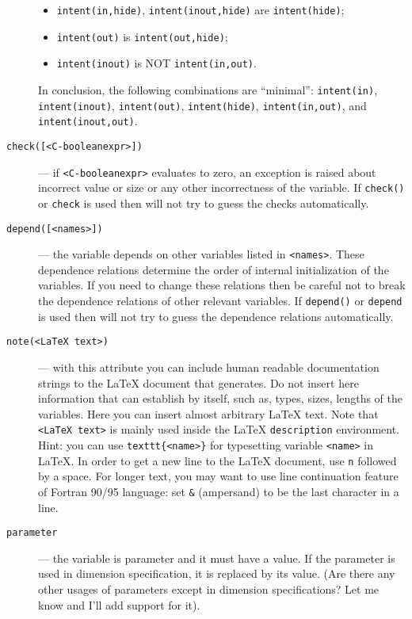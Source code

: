 \begin{description}
\begin{itemize}
  \item \texttt{intent(in,hide)}, \texttt{intent(inout,hide)} are \texttt{intent(hide)};
    \item \texttt{intent(out)} is \texttt{intent(out,hide)};
\item \texttt{intent(inout)} is NOT \texttt{intent(in,out)}.
  \end{itemize}
  In conclusion, the following combinations are ``minimal'':
  \texttt{intent(in)}, \texttt{intent(inout)}, \texttt{intent(out)},
  \texttt{intent(hide)}, \texttt{intent(in,out)}, and
  \texttt{intent(inout,out)}.
\item[\texttt{check([<C-booleanexpr>])}] --- if
  \texttt{<C-booleanexpr>} evaluates to zero, an exception is raised
  about incorrect value or size or any other incorrectness of the
  variable. If \texttt{check()} or \texttt{check} is used then \fpy
  will not try to guess the checks automatically.
\item[\texttt{depend([<names>])}] --- the variable depends on other
  variables listed in \texttt{<names>}. These dependence relations
  determine the order of internal initialization of the variables. If
  you need to change these relations then be careful not to break the
  dependence relations of other relevant variables. If
  \texttt{depend()} or \texttt{depend} is used then \fpy will not try
  to guess the dependence relations automatically.
\item[\texttt{note(<LaTeX text>)}] --- with this attribute you can
  include human readable documentation strings to the LaTeX document
  that \fpy generates. Do not insert here information that \fpy can
  establish by itself, such as, types, sizes, lengths of the
  variables.  Here you can insert almost arbitrary LaTeX text.  Note
  that \texttt{<LaTeX text>} is mainly used inside the LaTeX
  \texttt{description} environment.  Hint: you can use
  \texttt{\bs{}texttt\{<name>\}} for typesetting variable \texttt{<name>}
  in LaTeX. In order to get a new line to the LaTeX document, use
  \texttt{\bs{}n} followed by a space. For longer text, you may want
  to use line continuation feature of Fortran 90/95 language: set
  \texttt{\&} (ampersand)
  to be the last character in a line.
\item[\texttt{parameter}] --- the variable is parameter and it must
  have a value. If the parameter is used in dimension specification,
  it is replaced by its value. (Are there any other usages of
  parameters except in dimension specifications? Let me know and I'll
  add support for it).
\end{description}


